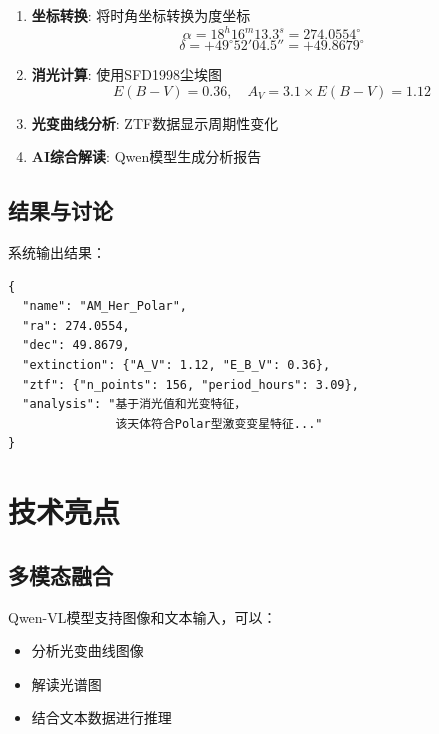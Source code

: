 \documentclass[a4paper,11pt]{article}
\begin{document}
\begin{enumerate}
    \item \textbf{坐标转换}: 将时角坐标转换为度坐标
    \begin{equation}
        \alpha = 18^{h}16^{m}13.3^{s} = 274.0554^{\circ}
    \end{equation}
    \begin{equation}
        \delta = +49^{\circ}52'04.5'' = +49.8679^{\circ}
    \end{equation}
    
    \item \textbf{消光计算}: 使用SFD1998尘埃图
    \begin{equation}
        E(B-V) = 0.36, \quad A_V = 3.1 \times E(B-V) = 1.12
    \end{equation}
    
    \item \textbf{光变曲线分析}: ZTF数据显示周期性变化
    \item \textbf{AI综合解读}: Qwen模型生成分析报告
\end{enumerate}

\subsection{结果与讨论}

系统输出结果：

\begin{verbatim}
{
  "name": "AM_Her_Polar",
  "ra": 274.0554,
  "dec": 49.8679,
  "extinction": {"A_V": 1.12, "E_B_V": 0.36},
  "ztf": {"n_points": 156, "period_hours": 3.09},
  "analysis": "基于消光值和光变特征，
               该天体符合Polar型激变变星特征..."
}
\end{verbatim}

\section{技术亮点}

\subsection{多模态融合}

Qwen-VL模型支持图像和文本输入，可以：
\begin{itemize}
    \item 分析光变曲线图像
    \item 解读光谱图
    \item 结合文本数据进行推理
\end{itemize}
\end{document}
